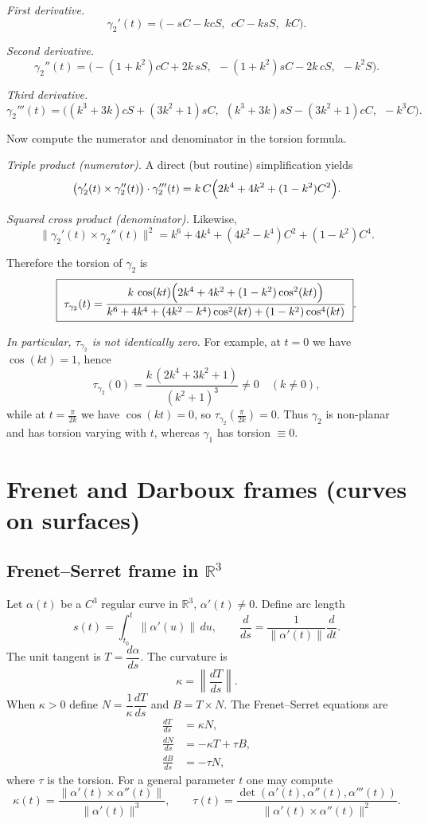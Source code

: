 \documentclass[12pt,a4paper]{article}
\theoremstyle{plain}
\theoremstyle{definition}      %
\begin{document}
\medskip
\noindent\emph{First derivative.}
\[
\gamma_2'(t)=
\bigl(-sC-kcS,\ \ cC-ksS,\ \ kC\bigr).
\]

\medskip
\noindent\emph{Second derivative.}
\[
\gamma_2''(t)=
\bigl(-(1+k^2)cC+2k\,sS,\ \ -(1+k^2)sC-2k\,cS,\ \ -k^2 S\bigr).
\]

\medskip
\noindent\emph{Third derivative.}
\[
\gamma_2'''(t)=
\bigl((k^3+3k)cS+(3k^2+1)sC,\ \ (k^3+3k)sS-(3k^2+1)cC,\ \ -k^3 C\bigr).
\]

Now compute the numerator and denominator in the torsion formula.

\medskip
\noindent\emph{Triple product (numerator).}
A direct (but routine) simplification yields
\[
\bigl(\gamma_2'(t)\times\gamma_2''(t)\bigr)\cdot\gamma_2'''(t)
=
k\,C\Bigl(2k^4+4k^2+(1-k^2)C^2\Bigr).
\]

\medskip
\noindent\emph{Squared cross product (denominator).}
Likewise,
\[
\|\gamma_2'(t)\times\gamma_2''(t)\|^2
=
k^6+4k^4+(4k^2-k^4)C^2+(1-k^2)C^4.
\]

Therefore the torsion of $\gamma_2$ is
\[
\boxed{
	\ \tau_{\gamma_2}(t)
	=
	\frac{
		k\,\cos(kt)\Bigl(2k^4+4k^2+(1-k^2)\cos^2(kt)\Bigr)
	}{
		k^6+4k^4+(4k^2-k^4)\cos^2(kt)+(1-k^2)\cos^4(kt)
	}
	\ }.
\]

\medskip
\noindent\emph{In particular, $\tau_{\gamma_2}$ is not identically zero.}
For example, at $t=0$ we have $\cos(kt)=1$, hence
\[
\tau_{\gamma_2}(0)
=
\frac{k\,(2k^4+3k^2+1)}{(k^2+1)^3}\neq 0
\quad (k\neq 0),
\]
while at $t=\frac{\pi}{2k}$ we have $\cos(kt)=0$, so $\tau_{\gamma_2}\!\left(\frac{\pi}{2k}\right)=0$.
Thus $\gamma_2$ is non-planar and has torsion varying with $t$, whereas $\gamma_1$ has torsion $\equiv 0$.



	
	\section*{Frenet and Darboux frames (curves on surfaces)}
	
	\subsection*{Frenet--Serret frame in $\mathbb{R}^3$}
	Let $\alpha(t)$ be a $C^3$ regular curve in $\mathbb{R}^3$, $\alpha'(t)\neq 0$.
	Define arc length
	\[
	s(t)=\int_{t_0}^t \|\alpha'(u)\|\,du,
	\qquad
	\frac{d}{ds}=\frac{1}{\|\alpha'(t)\|}\frac{d}{dt}.
	\]
	The unit tangent is $T=\dfrac{d\alpha}{ds}$. The curvature is
	\[
	\kappa=\left\|\frac{dT}{ds}\right\|.
	\]
	When $\kappa>0$ define $N=\dfrac{1}{\kappa}\dfrac{dT}{ds}$ and $B=T\times N$.
	The Frenet--Serret equations are
	\[
	\begin{aligned}
		\frac{dT}{ds}&=\kappa N,\\
		\frac{dN}{ds}&=-\kappa T+\tau B,\\
		\frac{dB}{ds}&=-\tau N,
	\end{aligned}
	\]
	where $\tau$ is the torsion.
	For a general parameter $t$ one may compute
	\[
	\kappa(t)=\frac{\|\alpha'(t)\times \alpha''(t)\|}{\|\alpha'(t)\|^3},
	\qquad
	\tau(t)=\frac{\det(\alpha'(t),\alpha''(t),\alpha'''(t))}
	{\|\alpha'(t)\times \alpha''(t)\|^2}.
	\]
	
\end{document}
